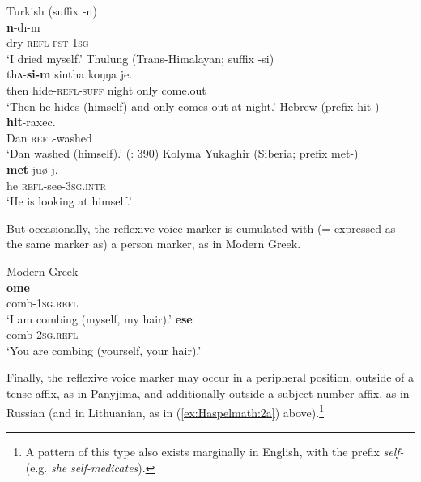 \documentclass[output=paper]{langscibook}
\begin{document}
\ea%
    \label{ex:Haspelmath:15}
    \ea Turkish  (suffix {{}-n})\label{ex:Haspelmath:15a}\\
    \textbf{{n}}{{}-dı-m}\\
     dry-\textsc{refl-pst-1sg}   \\
    \glt ‘I dried myself.’
    \ex Thulung (Trans-Himalayan; suffix {{}-si})\label{ex:Haspelmath:15b}\\
       {thʌ{}-\textbf{si-m}}  {sintha} {koŋŋa}   {je}.\\
        then  hide-\textsc{refl-suff}  night  only  come.out \\
    \glt ‘Then he hides (himself) and only comes out at night.’  \citep[54]{Lahaussois2016}
     \ex Hebrew (prefix {hit-})\label{ex:Haspelmath:15c}\\
       \textbf{{hit}}{{}-raxec.}\\
       Dan  \textsc{refl}{}-washed  \\
    \glt ‘Dan washed (himself).’ (\citealt{Reinhart2005}: 390)
     \ex Kolyma Yukaghir (Siberia; prefix {met-})\label{ex:Haspelmath:15d}\\
       \textbf{{met}}{{}-juø-j.}\\
      he  \textsc{refl}{}-see-\textsc{3sg.intr}  \\
    \glt‘He is looking at himself.’ \citep[227]{Maslova2003}
    \z
\z   
      

But occasionally, the reflexive voice marker is cumulated with (= expressed as the same marker as) a person marker, as in Modern Greek.

\ea Modern Greek \label{ex:Haspelmath:16}\\
    \ea  \label{ex:Haspelmath:16a}
    \textbf{{ome}}\\
       comb-\textsc{1sg.refl} \\
    \glt ‘I am combing (myself, my hair).’
    \ex  \label{ex:Haspelmath:16b}
    \textbf{{ese}}\\
       comb-\textsc{2sg.refl}  \\
    \glt ‘You are combing (yourself, your hair).’
    \z
\z 
          
Finally, the reflexive voice marker may occur in a peripheral position, outside of a tense affix, as in Panyjima, and additionally outside a subject number affix, as in Russian (and in Lithuanian, as in (\ref{ex:Haspelmath:2a}) above).\footnote{ {A pattern of this type also exists marginally in English, with the prefix} {\textit{self-}} {(e.g.} {\textit{she} \textit{self-medicates}}).}
\end{document}
